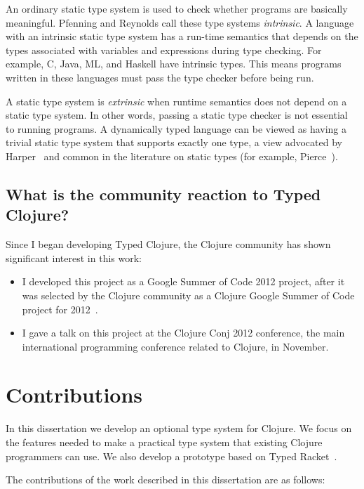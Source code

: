 An ordinary static type system is used to check whether programs are basically
meaningful. Pfenning and Reynolds call these type systems \emph{intrinsic}. A language with an intrinsic
static type system has a run-time semantics that depends on the types associated
with variables and expressions during type checking.
For example, C, Java, ML, and Haskell have intrinsic types.
This means programs written in these languages must pass the type checker before being run.

A static type system is \emph{extrinsic} when runtime semantics
does not depend on a static type system. In other words, passing a static type checker
is not essential to running programs. A dynamically typed language can be viewed
as having a trivial static type system that supports exactly one type,
a view advocated by Harper~\cite{Har12}
and common in the literature on static types (for example, Pierce~\cite{Pie02}).

\subsection{What is the community reaction to Typed Clojure?}

Since I began developing Typed Clojure, the Clojure community has shown significant interest in this work:


\begin{itemize}
  \item I developed this project as a Google Summer of Code 2012 project,
        after it was selected by the Clojure community as a Clojure Google Summer of Code
        project for 2012~\cite{GSOC2012}.
  \item I gave a talk on this project at the Clojure Conj
        2012 conference, the main international programming conference related to Clojure, in November.
\end{itemize}

\section{Contributions}

In this dissertation we develop an optional type system for Clojure.
We focus on the features needed to make a practical type system that
existing Clojure programmers can use.
We also develop a prototype based on Typed Racket~\cite{Tob10}.

The contributions of the work described in this dissertation are as follows:

